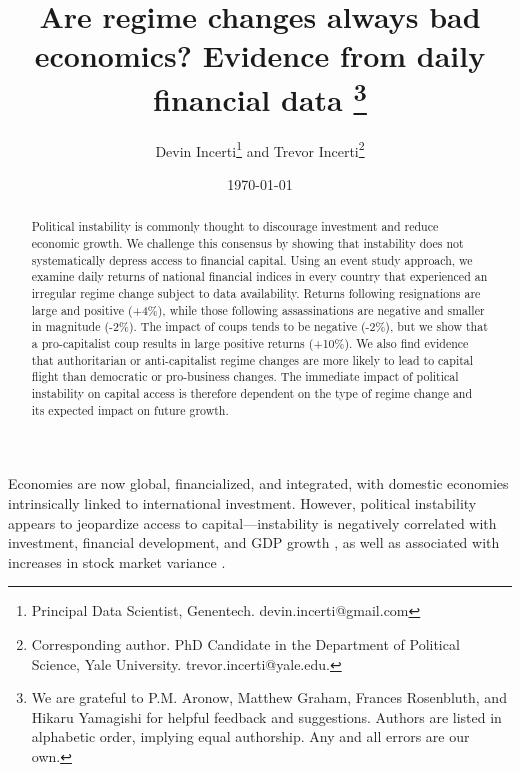 \documentclass[12pt,final,fleqn]{article}
\theoremstyle{plain}
\begin{document}
\author{Devin Incerti\thanks{Principal Data Scientist, Genentech. devin.incerti@gmail.com} and Trevor Incerti\thanks{Corresponding author. PhD Candidate in the Department of Political Science, Yale University. trevor.incerti@yale.edu.}}
\title{\textbf{Are regime changes always bad economics? Evidence from daily financial data \thanks{We are grateful to P.M. Aronow, Matthew Graham, Frances Rosenbluth, and Hikaru Yamagishi for helpful feedback and suggestions. Authors are listed in alphabetic order, implying equal authorship. Any and all errors are our own.}}}
\date{\today}
\maketitle
\thispagestyle{empty}

\singlespacing
\begin{abstract}
\noindent
Political instability is commonly thought to discourage investment and reduce economic growth. We challenge this consensus by showing that instability does not systematically depress access to financial capital. Using an event study approach, we examine daily returns of national financial indices in every country that experienced an irregular regime change subject to data availability. Returns following resignations are large and positive (+4\%), while those following assassinations are negative and smaller in magnitude (-2\%). The impact of coups tends to be negative (-2\%), but we show that a pro-capitalist coup results in large positive returns (+10\%). We also find evidence that authoritarian or anti-capitalist regime changes are more likely to lead to capital flight than democratic or pro-business changes.  The immediate impact of political instability on capital access is therefore dependent on the type of regime change and its expected impact on future growth. 

\end{abstract}

\clearpage
{}

\newpage

Economies are now global, financialized, and integrated, with domestic economies intrinsically linked to international investment. However, political instability appears to jeopardize access to capital---instability is negatively correlated with investment, financial development, and GDP growth \citep{aisen2013does, alesina1996income, alesina1996political, fosu1992political, jong2009measurement, roe2011political, baker2016measuring}, as well as associated with increases in stock market variance \citep{leblang2005government, jensen2005market, liu2015economic}.
\end{document}
